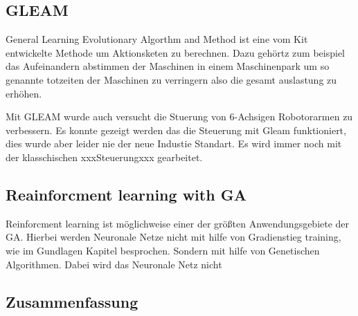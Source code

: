 \subsection{GLEAM}
General Learning Evolutionary Algorthm and Method ist eine vom Kit entwickelte Methode um Aktionsketen zu berechnen. Dazu gehörtz zum beispiel das Aufeinandern abstimmen der Maschinen in einem Maschinenpark um so genannte totzeiten der Maschinen zu verringern also die gesamt auslastung zu erhöhen.

Mit GLEAM wurde auch versucht die Stuerung von 6-Achsigen Robotorarmen zu verbessern. Es konnte gezeigt werden das die Steuerung mit Gleam funktioniert, dies wurde aber leider nie der neue Industie Standart. Es wird immer noch mit der klasschischen xxxSteuerungxxx  gearbeitet. 


\subsection{Reainforcment learning with GA}
Reinforcment learning ist möglichweise einer der größten Anwendungsgebiete der GA. Hierbei werden Neuronale Netze nicht mit hilfe von Gradienstieg training, wie im Gundlagen Kapitel besprochen. Sondern mit hilfe von Genetischen Algorithmen. Dabei wird das Neuronale Netz nicht 




\subsection{Zusammenfassung}